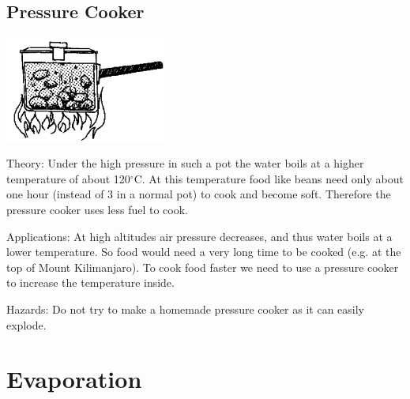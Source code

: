 \begin{multicols}{2}
\subsection{Pressure Cooker}

\begin{center}
\includegraphics[width=0.4\textwidth]{./img/source/pressure-cooker.png}
\end{center}

\begin{description*}
\item[Theory:]{Under the high pressure in such a pot the water boils at a higher temperature of about 120$^\circ$C. At this temperature food like beans need only about one hour (instead of 3 in a normal pot) to cook and become soft. Therefore the pressure cooker uses less fuel to cook.}
\item[Applications:]{At high altitudes air pressure decreases, and thus water boils at a lower temperature. So food would need a very long time to be cooked (e.g. at the top of Mount Kilimanjaro). To cook food faster we need to use a pressure cooker to increase the temperature inside.}
\item[Hazards:]{Do not try to make a homemade pressure cooker as it can easily explode.}
\end{description*}

\columnbreak


\section*{Evaporation}



\end{multicols}
